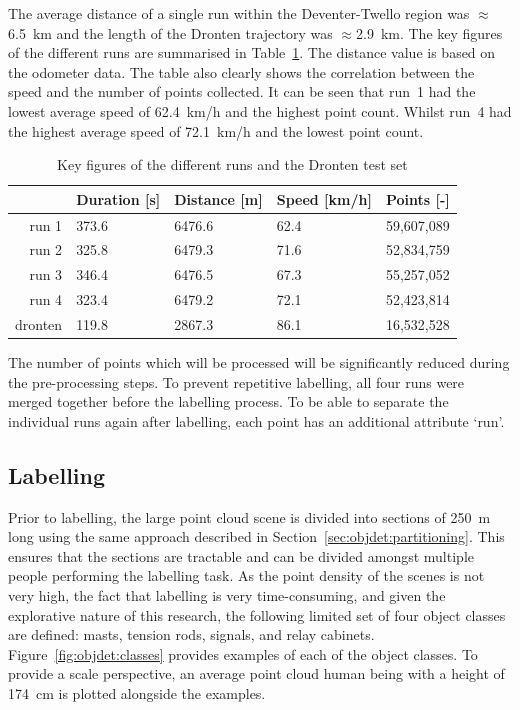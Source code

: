 The average distance of a single run within the Deventer-Twello region was $\approx$6.5~km and the length of the Dronten trajectory was $\approx$2.9~km. The key figures of the different runs are summarised in Table~\ref{tbl:objdet:runstats}. The distance value is based on the odometer data. The table also clearly shows the correlation between the speed and the number of points collected. It can be seen that run~1 had the lowest average speed of 62.4~km/h and the highest point count. Whilst run~4 had the highest average speed of 72.1~km/h and the lowest point count.
\begin{table}[ht]
    \centering
    \begin{tabular}{rllll}
        \toprule
        & Duration [s] & Distance [m] & Speed [km/h] & Points [-]\\
        \midrule
        run 1   & 373.6 & 6476.6 & 62.4 & 59,607,089\\
        run 2   & 325.8 & 6479.3 & 71.6 & 52,834,759\\
        run 3   & 346.4 & 6476.5 & 67.3 & 55,257,052\\
        run 4   & 323.4 & 6479.2 & 72.1 & 52,423,814\\
        dronten & 119.8 & 2867.3 & 86.1 & 16,532,528\\
        \bottomrule
    \end{tabular}
    \caption{Key figures of the different runs and the Dronten test set}
    \label{tbl:objdet:runstats}
\end{table}
The number of points which will be processed will be significantly reduced during the pre-processing steps. To prevent repetitive labelling, all four runs were merged together before the labelling process. To be able to separate the individual runs again after labelling, each point has an additional attribute `run'.

\subsection{Labelling}
Prior to labelling, the large point cloud scene is divided into sections of 250~m long using the same approach described in Section~\ref{sec:objdet:partitioning}. This ensures that the sections are tractable and can be divided amongst multiple people performing the labelling task. As the point density of the scenes is not very high, the fact that labelling is very time-consuming, and given the explorative nature of this research, the following limited set of four object classes are defined: masts, tension rods, signals, and relay cabinets. Figure~\ref{fig:objdet:classes} provides examples of each of the object classes. To provide a scale perspective, an average point cloud human being with a height of 174~cm is plotted alongside the examples. 

